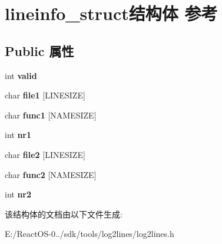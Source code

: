 \hypertarget{structlineinfo__struct}{}\section{lineinfo\+\_\+struct结构体 参考}
\label{structlineinfo__struct}
\subsection*{Public 属性}
\begin{DoxyCompactItemize}
\item 
\mbox{\label{structlineinfo__struct_a3c4727c0622545b2f377c007cbba4844}} 
int {\bfseries valid}
\item 
\mbox{\label{structlineinfo__struct_a6f9059e9eeaba469a61919af8a9685c2}} 
char {\bfseries file1} \mbox{[}L\+I\+N\+E\+S\+I\+ZE\mbox{]}
\item 
\mbox{\label{structlineinfo__struct_ad4af16687538411b7196f5c52a6fbbfe}} 
char {\bfseries func1} \mbox{[}N\+A\+M\+E\+S\+I\+ZE\mbox{]}
\item 
\mbox{\label{structlineinfo__struct_a0348b76f08950431bef217840f11b1ed}} 
int {\bfseries nr1}
\item 
\mbox{\label{structlineinfo__struct_a37783c8fd36723f52b7302617ff7c648}} 
char {\bfseries file2} \mbox{[}L\+I\+N\+E\+S\+I\+ZE\mbox{]}
\item 
\mbox{\label{structlineinfo__struct_af81f08c5bc823542c2e4059044c273de}} 
char {\bfseries func2} \mbox{[}N\+A\+M\+E\+S\+I\+ZE\mbox{]}
\item 
\mbox{\label{structlineinfo__struct_a17accffe5c739cc9e2ea1d46af01d47d}} 
int {\bfseries nr2}
\end{DoxyCompactItemize}


该结构体的文档由以下文件生成\+:\begin{DoxyCompactItemize}
\item 
E\+:/\+React\+O\+S-\/0../sdk/tools/log2lines/log2lines.\+h\end{DoxyCompactItemize}
